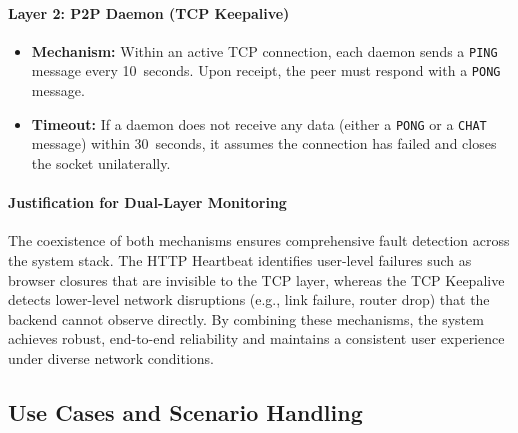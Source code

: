 \paragraph{Layer 2: P2P Daemon (TCP Keepalive)}
\begin{itemize}
    \item \textbf{Mechanism:} Within an active TCP connection, each daemon sends a \texttt{PING} message every 10~seconds. 
    Upon receipt, the peer must respond with a \texttt{PONG} message.
    \item \textbf{Timeout:} If a daemon does not receive any data (either a \texttt{PONG} or a \texttt{CHAT} message) within 30~seconds, it assumes the connection has failed and closes the socket unilaterally.
\end{itemize}

\paragraph{Justification for Dual-Layer Monitoring}
The coexistence of both mechanisms ensures comprehensive fault detection across the system stack. 
The HTTP Heartbeat identifies user-level failures such as browser closures that are invisible to the TCP layer, whereas the TCP Keepalive detects lower-level network disruptions (e.g., link failure, router drop) that the backend cannot observe directly. 
By combining these mechanisms, the system achieves robust, end-to-end reliability and maintains a consistent user experience under diverse network conditions.

\subsection{Use Cases and Scenario Handling}


